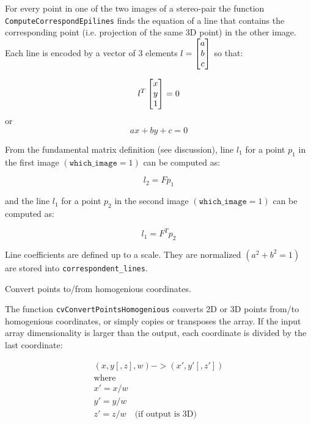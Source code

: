 For every point in one of the two images of a stereo-pair the function
\texttt{ComputeCorrespondEpilines} finds the equation of a line that
contains the corresponding point (i.e. projection of the same 3D
point) in the other image. Each line is encoded by a vector of 3
elements $l = \begin{bmatrix} a\\ b\\ c \end{bmatrix}$ so that:

\[ l^T \begin{bmatrix} x\\ y\\ 1 \end{bmatrix} = 0 \]
or
\[ a x + b y + c = 0 \]

From the fundamental matrix definition (see 
discussion), line $l_1$ for a point $p_1$ in the first image
$(\texttt{which\_image} =1)$ can be computed as:

\[ l_2 = F p_1 \]

and the line $l_1$ for a point $p_2$ in the second image $(\texttt{which\_image} =1)$ can be computed as:

\[ l_1 = F^T p_2 \]

Line coefficients are defined up to a scale. They are normalized $(a^2+b^2=1)$ are stored into \texttt{correspondent\_lines}.

\label{ConvertPointsHomogenious}

Convert points to/from homogenious coordinates.


\begin{description}
\end{description}

The function \texttt{cvConvertPointsHomogenious} converts 2D or 3D points from/to homogenious coordinates, or simply copies or transposes the array. If the input array dimensionality is larger than the output, each coordinate is divided by the last coordinate:

\[
\begin{array}{l}
(x,y[,z],w) -> (x',y'[,z'])\\
\text{where} \\
x' = x/w \\
y' = y/w \\
z' = z/w \quad \text{(if output is 3D)}
\end{array}
\]

